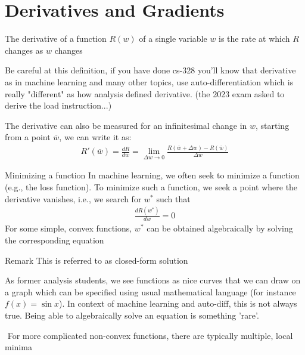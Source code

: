 \section{Derivatives and Gradients}
\begin{definition}
The derivative of a function $R\left(w\right)$ of a single variable $w$ is the rate at which $R$ changes as $w$ changes
\end{definition}
\begin{framedremark}
Be careful at this definition, if you have done cs-328 you'll know that derivative as in machine learning and many other topics, use auto-differentiation which is really "different" as how analysis defined derivative. (the 2023 exam asked to derive the load instruction...)
\end{framedremark}
The derivative can also be measured for an infinitesimal change in $w$, starting from a point $\overline{w}$, we can write it as:
\begin{align*} R'\left(\overline{w}\right) = \frac{dR}{dw} =  \lim_{\Delta w  \to 0} \frac{R\left(\overline{w} + \Delta w\right) - R\left(\overline{w}\right)}{\Delta w} \end{align*}
\begin{parag}{Minimizing a function}
    In machine learning, we often seek to minimize a function (e.g., the loss function). To minimize such a function, we seek a point where the derivative vanishes, i.e., we search for $w^{\ast}$ such that 
	\begin{align*} \frac{d R\left(w^{\ast}\right)}{dw} = 0 \end{align*}
	For some simple, convex functions, $w^{\ast}$ can be obtained algebraically by solving the corresponding equation
	\begin{subparag}{Remark}
	    This is referred to as closed-form solution
	\end{subparag}
\end{parag}
	\begin{framedremark}

	As former analysis students, we see functions as nice curves that we can draw on a graph which can be specified using usual mathematical language (for instance $f\left(x\right) =  \sin x$). In context of machine learning and auto-diff, this is not always true. Being able to algebraically solve an equation is something 'rare'.
	\end{framedremark}

	\begin{parag}{$ $}
	    For more complicated non-convex functions, there are typically multiple, local minima
	\end{parag}
	



